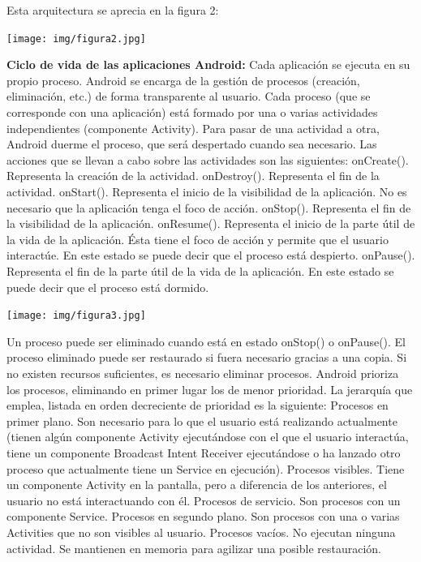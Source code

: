 \documentclass[12 pt, a4paper, twoside]{article}
\begin{document}
Esta arquitectura se aprecia en la figura 2:
\begin{center}
  \texttt{[image: img/figura2.jpg]}
\end{center}

\textbf{Ciclo de vida de las aplicaciones Android:}
Cada aplicación se ejecuta en su propio proceso. Android se encarga de la
gestión de procesos (creación, eliminación, etc.) de forma transparente al usuario.
Cada proceso (que se corresponde con una aplicación) está formado por una o varias
actividades independientes (componente Activity). Para pasar de una actividad
a otra, Android duerme el proceso, que será despertado cuando sea necesario. Las
acciones que se llevan a cabo sobre las actividades son las siguientes:
onCreate(). Representa la creación de la actividad.
onDestroy(). Representa el fin de la actividad.
onStart(). Representa el inicio de la visibilidad de la aplicación. No es
necesario que la aplicación tenga el foco de acción.
onStop(). Representa el fin de la visibilidad de la aplicación.
onResume(). Representa el inicio de la parte útil de la vida de la aplicación.
Ésta tiene el foco de acción y permite que el usuario interactúe. En este
estado se puede decir que el proceso está despierto.
onPause(). Representa el fin de la parte útil de la vida de la aplicación. En
este estado se puede decir que el proceso está dormido.

\begin{center}
  \texttt{[image: img/figura3.jpg]}
\end{center}

Un proceso puede ser eliminado cuando está en estado onStop() o onPause().
El proceso eliminado puede ser restaurado si fuera necesario gracias a una copia.
Si no existen recursos suficientes, es necesario eliminar procesos. Android prioriza
los procesos, eliminando en primer lugar los de menor prioridad. La jerarquía que
emplea, listada en orden decreciente de prioridad es la siguiente:
Procesos en primer plano. Son necesario para lo que el usuario está realizando
actualmente (tienen algún componente Activity ejecutándose con
el que el usuario interactúa, tiene un componente Broadcast Intent
Receiver ejecutándose o ha lanzado otro proceso que actualmente tiene un
Service en ejecución).
Procesos visibles. Tiene un componente Activity en la pantalla, pero a
diferencia de los anteriores, el usuario no está interactuando con él.
Procesos de servicio. Son procesos con un componente Service.
Procesos en segundo plano. Son procesos con una o varias Activities
que no son visibles al usuario.
Procesos vacíos. No ejecutan ninguna actividad. Se mantienen en memoria
para agilizar una posible restauración.
\end{document}
